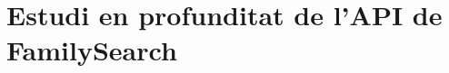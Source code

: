 \chapter{Estudi en profunditat de l'API de FamilySearch}

    
    
    
    
    
    
    
    
    
